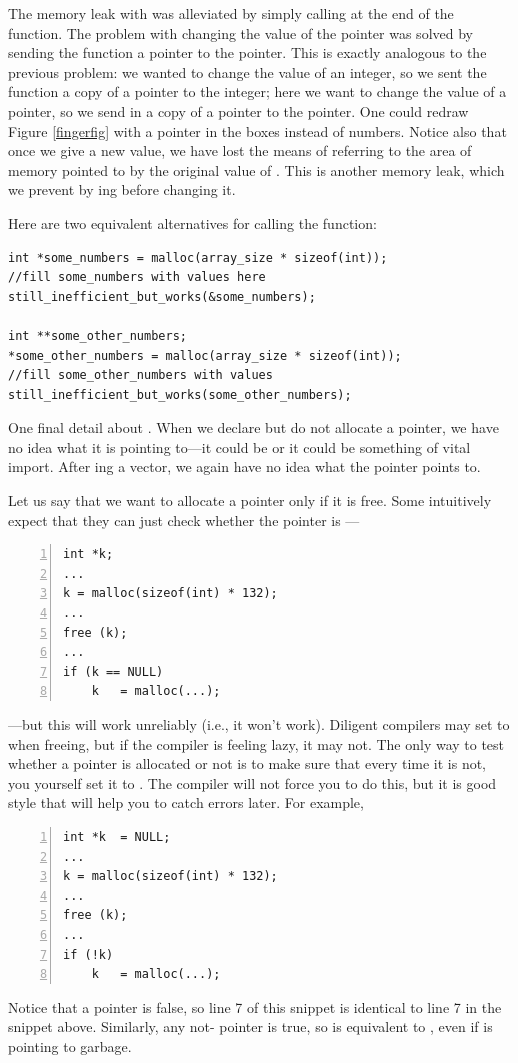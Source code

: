 The memory leak with  was alleviated by simply
calling  at the end of the function. The problem with
changing the value of the pointer was solved by sending the function a
pointer to the pointer. This is exactly analogous to the previous problem:
we wanted to change the value of an integer, so we sent the function a
copy of a pointer to the integer; here we want to change the value of a
pointer, so we send in a copy of a pointer to the pointer. One could
redraw Figure \ref{fingerfig} with a pointer in the boxes instead of
numbers. Notice also
that once we give  a new value, we have lost the
means of referring to the area of memory pointed to by the original
value of . This is another memory leak, which we
prevent by ing  before changing it.

Here are two equivalent alternatives for calling the function:
\begin{lstlisting}
int *some_numbers = malloc(array_size * sizeof(int));
//fill some_numbers with values here
still_inefficient_but_works(&some_numbers);

int **some_other_numbers;
*some_other_numbers = malloc(array_size * sizeof(int));
//fill some_other_numbers with values
still_inefficient_but_works(some_other_numbers);
\end{lstlisting}

One final detail about . When we declare but do not allocate a
pointer, we have no idea what it is pointing to---it could be 
or it could be something of vital import. After ing a vector,
we again have no idea what the pointer points to.

Let us say that we want to allocate a pointer only if it is free. Some
intuitively expect that they can just check whether the pointer is
---
\begin{lstlisting}[numbers=left, numberstyle=\scshape]
int *k;
...
k = malloc(sizeof(int) * 132); 
...
free (k);
...
if (k == NULL)
    k   = malloc(...);
\end{lstlisting}
---but this will work unreliably (i.e., it won't work). Diligent compilers
may set  to  when freeing, but if the compiler is feeling
lazy, it may not. The only way
to test whether a pointer is allocated or not is to make sure that every
time it is not, you yourself set it to . The compiler will not
force you to do this, but it is good style that will help you to catch
errors later. For example,
\begin{lstlisting}[numbers=left, numberstyle=\scshape]
int *k  = NULL;
...
k = malloc(sizeof(int) * 132); 
...
free (k);
...
if (!k)
    k   = malloc(...);
\end{lstlisting}
Notice that a  pointer is false, so line 7 of this snippet is
identical to line 7 in the snippet above.
Similarly, any not- pointer is true,
so  is equivalent to , even if  is pointing
to garbage.


